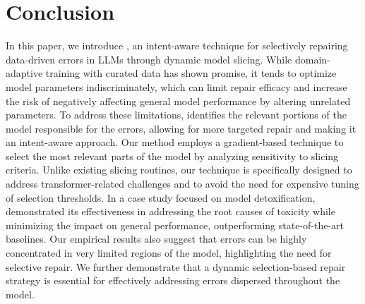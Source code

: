 \section{Conclusion}
\label{sec:conclusion}

In this paper, we introduce \nick, an intent-aware technique for selectively repairing data-driven errors in LLMs through dynamic model slicing. While domain-adaptive training with curated data has shown promise, it tends to optimize model parameters indiscriminately, which can limit repair efficacy and increase the risk of negatively affecting general model performance by altering unrelated parameters. To address these limitations, \nick identifies the relevant portions of the model responsible for the errors, allowing for more targeted repair and making it an intent-aware approach. Our method employs a gradient-based technique to select the most relevant parts of the model by analyzing sensitivity to slicing criteria. Unlike existing slicing routines, our technique is specifically designed to address transformer-related challenges and to avoid the need for expensive tuning of selection thresholds. In a case study focused on model detoxification, \nick demonstrated its effectiveness in addressing the root causes of toxicity while minimizing the impact on general performance, outperforming state-of-the-art baselines. Our empirical results also suggest that errors can be highly concentrated in very limited regions of the model, highlighting the need for selective repair. We further demonstrate that a dynamic selection-based repair strategy is essential for effectively addressing errors dispersed throughout the model.




